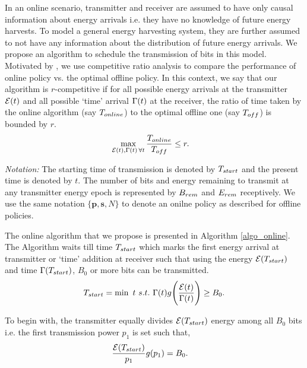 In an online scenario, transmitter and receiver are assumed to have only causal information about energy arrivals i.e. they have no knowledge of future energy harvests. To model a general energy harvesting system, they are further assumed to not have any information about the distribution of future energy arrivals. We propose an algorithm to schedule the transmission of bits in this model. Motivated by \cite{VazeCompetitive}, we use competitive ratio analysis to compare the performance of online policy vs. the optimal offline policy. In this context, we say that our algorithm is $r$-competitive if for all possible energy arrivals at the transmitter $\mathcal{E}(t)$ and all possible `time' arrival $\Gamma(t)$ at the receiver, the ratio of time taken by the online algorithm (say $T_{\mbox{\scriptsize{online}}}$) to the optimal offline one (say $T_{\mbox{\scriptsize{off}}}$) is bounded by $r$.
\begin{align}
&\displaystyle\max_{\ETx(t),\TRx(t)\hspace{0.5mm} \forall t}\dfrac{T_{\mbox{\scriptsize{online}}}}{T_{\mbox{\scriptsize{off}}}}\le r.
\end{align}
 
\textit{Notation:} The starting time of transmission is denoted by $T_{\mbox{\scriptsize{start}}}$ and the present time is denoted by $t$. The number of bits and energy remaining to transmit at any transmitter energy epoch is represented by $B_{\mbox{\scriptsize{rem}}}$ and $E_{\mbox{\scriptsize{rem}}}$ receptively. We use the same notation $\{\bm{p},\bm{s},N\}$ to denote an onilne policy as described for offline policies.

The online algorithm that we propose is presented in Algorithm \ref{algo_online}. The Algorithm waits till time $T_{\mbox{\scriptsize{start}}}$ which marks the first energy arrival at transmitter or `time' addition at receiver such that using the energy $\ETx(T_{\mbox{\scriptsize{start}}})$ and time $\TRx(T_{\mbox{\scriptsize{start}}})$, $B_0$ or more bits can be transmitted.
\begin{equation}
T_{\mbox{\scriptsize{start}}}=\min\ t \ s.t.\  \TRx(t)g\Bigg{(} \dfrac{\ETx(t)}{\TRx(t)}\Bigg{)}\ge B_0.\label{online_T_start}
\end{equation}

To begin with, the transmitter equally divides $\ETx(T_{\mbox{\scriptsize{start}}})$ energy among all $B_0$ bits i.e. the first transmission power $p_1$ is set such that,
\begin{align}
&\frac{\ETx(T_{\mbox{\scriptsize{start}}})}{p_1}g(p_1)=B_0.
\label{eq_online_first_power}
\end{align}

